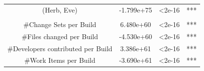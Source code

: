 \begin{table}[t]
\begin{tabular}{cccc}
(Herb, Eve)  	&   -1.799e+75     & <2e-16 &***\\
\\
\#Change Sets per Build     & \phantom{-}6.480e+60 &   <2e-16 &***\\
\#Files changed per Build            &-4.530e+60 &  <2e-16 &***\\
{\small \#Developers contributed per Build}  &   \phantom{-}3.386e+61 &  <2e-16 &***\\
\#Work Items per Build    &  -3.690e+61   & <2e-16 &***\\
%
%
%

\end{tabular}
\end{table}
